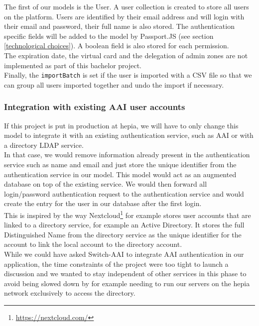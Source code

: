 \documentclass[11pt,a4paper]{report}
\begin{document}
The first of our models is the User. A user collection is created to store all users on the platform. Users are identified by their email address and will login with their email and password, their full name is also stored. The authentication specific fields will be added to the model by Passport.JS (see section \ref{technological choices}). A boolean field is also stored for each permission.\\

The expiration date, the virtual card and the delegation of admin zones are not implemented as part of this bachelor project. \\

Finally, the \verb+importBatch+ is set if the user is imported with a CSV file so that we can group all users imported together and undo the import if necessary.
\subsubsection{Integration with existing AAI user accounts}
If this project is put in production at hepia, we will have to only change this model to integrate it with an existing authentication service, such as AAI or with a directory LDAP service.\\

In that case, we would remove information already present in the authentication service such as name and email and just store the unique identifier from the authentication service in our model. This model would act as an augmented database on top of the existing service. We would then forward all login/password authentication request to the authentication service and would create the entry for the user in our database after the first login.\\

This is inspired by the way Nextcloud\footnote{\url{https://nextcloud.com/}} for example stores user accounts that are linked to a directory service, for example an Active Directory. It stores the full Distinguished Name from the directory service as the unique identifier for the account to link the local account to the directory account.\\

While we could have asked Switch-AAI to integrate AAI authentication in our application, the time constraints of the project were too tight to launch a discussion and we wanted to stay independent of other services in this phase to avoid being slowed down by for example needing to run our servers on the hepia network exclusively to access the directory.
\end{document}
